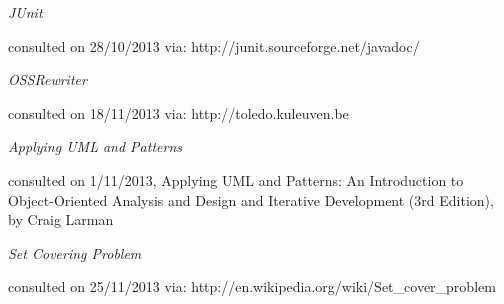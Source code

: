 \documentclass[i2]{oss}
\begin{document}
\begin{flushleft}
\begin{thebibliography}{9}

\textit{JUnit}
\begin{scriptsize}
consulted on 28/10/2013 via: \mbox{http://junit.sourceforge.net/javadoc/}
\end{scriptsize}

\textit{OSSRewriter}
\begin{scriptsize}
consulted on 18/11/2013 via: \mbox{http://toledo.kuleuven.be}
\end{scriptsize}

\textit{Applying UML and Patterns}
\begin{scriptsize}
consulted on 1/11/2013, Applying UML and Patterns: An Introduction to Object-Oriented Analysis and Design and Iterative Development (3rd Edition), by Craig Larman
\end{scriptsize}

\textit{Set Covering Problem}
\begin{scriptsize}
consulted on 25/11/2013 via: \mbox{http://en.wikipedia.org/wiki/Set\_cover\_problem}
\end{scriptsize}


\end{thebibliography}
\end{flushleft}

 
\end{document}
